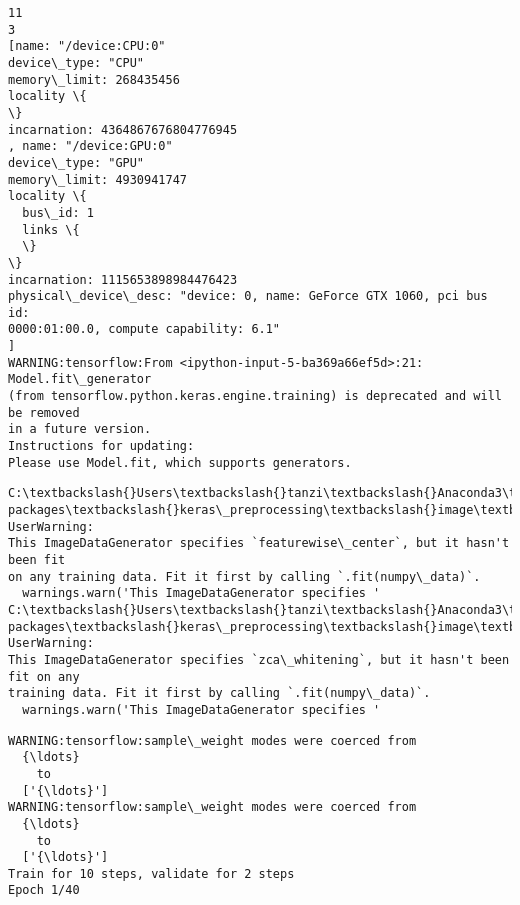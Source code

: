 \documentclass[11pt]{article}
\begin{document}
    \begin{Verbatim}[commandchars=\\\{\}]
11
3
[name: "/device:CPU:0"
device\_type: "CPU"
memory\_limit: 268435456
locality \{
\}
incarnation: 4364867676804776945
, name: "/device:GPU:0"
device\_type: "GPU"
memory\_limit: 4930941747
locality \{
  bus\_id: 1
  links \{
  \}
\}
incarnation: 1115653898984476423
physical\_device\_desc: "device: 0, name: GeForce GTX 1060, pci bus id:
0000:01:00.0, compute capability: 6.1"
]
WARNING:tensorflow:From <ipython-input-5-ba369a66ef5d>:21: Model.fit\_generator
(from tensorflow.python.keras.engine.training) is deprecated and will be removed
in a future version.
Instructions for updating:
Please use Model.fit, which supports generators.
    \end{Verbatim}

    \begin{Verbatim}[commandchars=\\\{\}]
C:\textbackslash{}Users\textbackslash{}tanzi\textbackslash{}Anaconda3\textbackslash{}lib\textbackslash{}site-
packages\textbackslash{}keras\_preprocessing\textbackslash{}image\textbackslash{}image\_data\_generator.py:716: UserWarning:
This ImageDataGenerator specifies `featurewise\_center`, but it hasn't been fit
on any training data. Fit it first by calling `.fit(numpy\_data)`.
  warnings.warn('This ImageDataGenerator specifies '
C:\textbackslash{}Users\textbackslash{}tanzi\textbackslash{}Anaconda3\textbackslash{}lib\textbackslash{}site-
packages\textbackslash{}keras\_preprocessing\textbackslash{}image\textbackslash{}image\_data\_generator.py:735: UserWarning:
This ImageDataGenerator specifies `zca\_whitening`, but it hasn't been fit on any
training data. Fit it first by calling `.fit(numpy\_data)`.
  warnings.warn('This ImageDataGenerator specifies '
    \end{Verbatim}

    \begin{Verbatim}[commandchars=\\\{\}]
WARNING:tensorflow:sample\_weight modes were coerced from
  {\ldots}
    to
  ['{\ldots}']
WARNING:tensorflow:sample\_weight modes were coerced from
  {\ldots}
    to
  ['{\ldots}']
Train for 10 steps, validate for 2 steps
Epoch 1/40
    \end{Verbatim}
\end{document}
